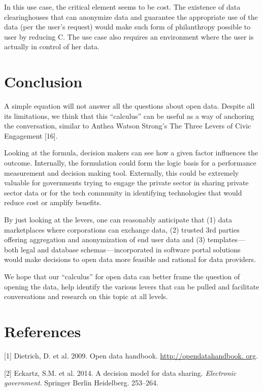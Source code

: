\documentclass[]{acm_proc_article-sp}
\begin{document}
In this use case, the critical element seems to be cost. The existence
of data clearinghouses that can anonymize data and guarantee the
appropriate use of the data (per the user's request) would make such
form of philanthropy possible to user by reducing C. The use case also
requires an environment where the user is actually in control of her
data.

\section{Conclusion}\label{conclusion}

A simple equation will not answer all the questions about open data.
Despite all its limitations, we think that this ``calculus'' can be
useful as a way of anchoring the conversation, similar to Anthea Watson
Strong's The Three Levers of Civic Engagement {[}16{]}.

Looking at the formula, decision makers can see how a given factor
influences the outcome. Internally, the formulation could form the logic
basis for a performance measurement and decision making tool.
Externally, this could be extremely valuable for governments trying to
engage the private sector in sharing private sector data or for the tech
community in identifying technologies that would reduce cost or amplify
benefits.

By just looking at the levers, one can reasonably anticipate that (1)
data marketplaces where corporations can exchange data, (2) trusted 3rd
parties offering aggregation and anonymization of end user data and (3)
templates --- both legal and database schemas --- incorporated in
software portal solutions would make decisions to open data more
feasible and rational for data providers.

We hope that our ``calculus'' for open data can better frame the
question of opening the data, help identify the various levers that can
be pulled and facilitate conversations and research on this topic at all
levels.

\section*{References}\label{references}

{[}1{]} Dietrich, D. et al. 2009. Open data handbook.
\href{http://opendatahandbook. org}{http://opendatahandbook. org}.

{[}2{]} Eckartz, S.M. et al. 2014. A decision model for data sharing.
\emph{Electronic government}. Springer Berlin Heidelberg. 253--264.
\end{document}
